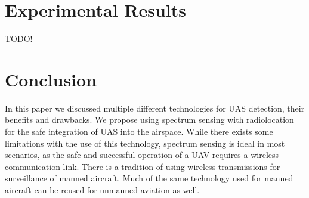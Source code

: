 \documentclass[journal,transmag]{IEEEtran}
\begin{document}
%



\section{Experimental Results}
TODO!


\section{Conclusion}
In this paper we discussed multiple different technologies for UAS detection, their benefits and drawbacks.  We propose using spectrum sensing with radiolocation for the safe integration of UAS into the airspace. While there exists some limitations with the use of this technology, spectrum sensing is ideal in most scenarios, as the safe and successful operation of a UAV requires a wireless communication link.  There is a tradition of using wireless transmissions for surveillance of manned aircraft. Much of the same technology used for manned aircraft can be reused for unmanned aviation as well.
\end{document}

